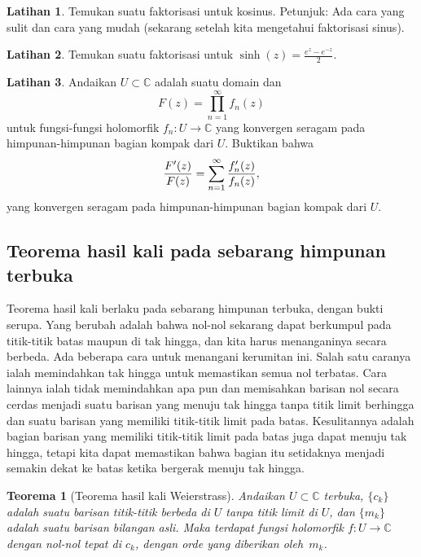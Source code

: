 \documentclass[12pt,openany]{book}
\newcommand{\avoidbreak}{\postdisplaypenalty=100}
\newcommand{\C}{{\mathbb{C}}}
\theoremstyle{plain}
\newtheorem{thm}{Teorema}[section]
\theoremstyle{remark}
\theoremstyle{definition}
\newenvironment{exbox}{%
    \def\FrameCommand{\vrule width 1pt \relax\hspace{10pt}}%
    \MakeFramed{\advance\hsize-\width\FrameRestore}%
}{%
    \endMakeFramed
}
\theoremstyle{exercise}
\newtheorem{exercise}{Latihan}[section]
\theoremstyle{example}
\begin{document}
\begin{exbox}
\begin{exercise}
Temukan suatu faktorisasi untuk kosinus.  Petunjuk: Ada cara yang sulit dan cara yang
mudah (sekarang setelah kita mengetahui faktorisasi sinus).
\end{exercise}

\begin{exercise}
Temukan suatu faktorisasi untuk $\sinh(z) = \frac{e^z-e^{-z}}{2}$.
\end{exercise}

\begin{exercise}
Andaikan $U \subset \C$ adalah suatu domain dan
\begin{equation*}
F(z) = \prod_{n=1}^\infty f_n(z)
\end{equation*}
untuk fungsi-fungsi holomorfik $f_n \colon U \to \C$ yang konvergen seragam 
pada himpunan-himpunan bagian kompak dari $U$.  Buktikan bahwa
\begin{equation*}
\frac{F'(z)}{F(z)} = \sum_{n=1}^\infty \frac{f_n'(z)}{f_n(z)} ,
\avoidbreak
\end{equation*}
yang konvergen seragam pada himpunan-himpunan bagian kompak dari $U$.
\end{exercise}
\end{exbox}

\subsection{Teorema hasil kali pada sebarang himpunan terbuka}

Teorema hasil kali berlaku pada sebarang himpunan terbuka, dengan bukti serupa.
Yang berubah adalah bahwa nol-nol sekarang dapat berkumpul pada titik-titik
batas maupun di tak hingga,
dan kita harus menanganinya secara berbeda.
Ada beberapa cara untuk menangani
kerumitan ini.
Salah satu caranya ialah memindahkan tak hingga untuk memastikan semua nol terbatas.
Cara lainnya ialah tidak memindahkan apa pun dan memisahkan barisan nol secara
cerdas menjadi suatu barisan yang menuju tak hingga tanpa titik limit
berhingga dan suatu barisan yang memiliki titik-titik limit pada batas.  Kesulitannya
adalah bagian barisan yang memiliki titik-titik limit pada
batas juga dapat menuju tak hingga, tetapi kita dapat memastikan bahwa bagian itu setidaknya menjadi
semakin dekat ke batas ketika bergerak menuju tak hingga.

\begin{thm}[Teorema hasil kali Weierstrass]
\label{thm:weierprod}
Andaikan $U \subset \C$ terbuka, $\{ c_k \}$ adalah
suatu barisan titik-titik berbeda di $U$
tanpa titik limit di $U$, dan $\{ m_k \}$ adalah suatu barisan
bilangan asli.
Maka terdapat fungsi holomorfik $f \colon U \to \C$ dengan
nol-nol tepat di $c_k$, dengan orde yang diberikan oleh~$m_k$.
\end{thm}
\end{document}
